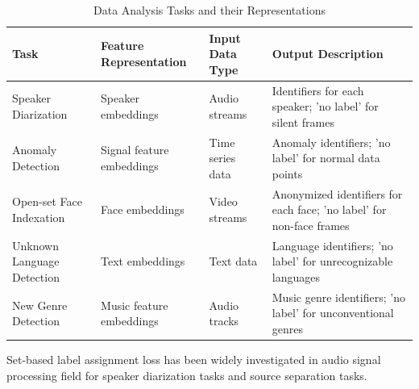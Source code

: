 \documentclass{article}
\begin{document}
\begin{table}[h]
  \centering
  \renewcommand{\arraystretch}{1.5} %
  \begin{tabularx}{\textwidth}{p{3cm}|p{3cm}|p{2.5cm}|p{3cm}}
    \toprule
    \textbf{Task}              & \textbf{Feature Representation} & \textbf{Input Data Type} & \textbf{Output Description}                                          \\
    \hline
    Speaker Diarization        & Speaker embeddings              & Audio streams            & Identifiers for each speaker; 'no label' for silent frames           \\
    \hline
    Anomaly Detection          & Signal feature embeddings       & Time series data         & Anomaly identifiers; 'no label' for normal data points               \\
    \hline
    Open-set Face Indexation   & Face embeddings                 & Video streams            & Anonymized identifiers for each face; 'no label' for non-face frames \\
    \hline
    Unknown Language Detection & Text embeddings                 & Text data                & Language identifiers; 'no label' for unrecognizable languages        \\
    \hline
    New Genre Detection        & Music feature embeddings        & Audio tracks             & Music genre identifiers; 'no label' for unconventional genres        \\
    \bottomrule
  \end{tabularx}
  \vspace{1.5px}
  \caption{Data Analysis Tasks and their Representations}
  \label{tab:tasks}
\end{table}
Set-based label assignment loss has been widely investigated in audio signal processing field for speaker diarization tasks and source separation tasks.
\end{document}
